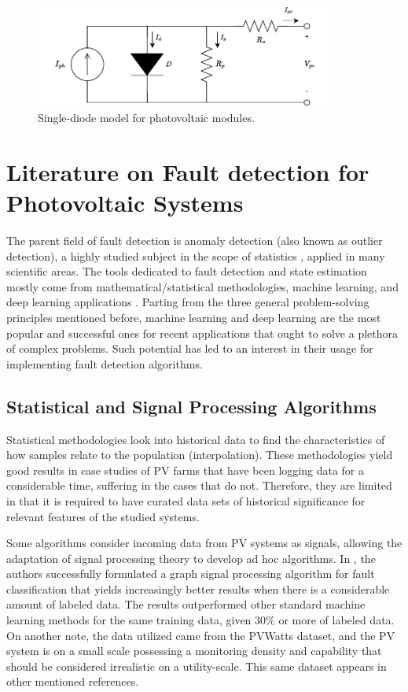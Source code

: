 \begin{figure}[h]
    \centering
    \includegraphics[width=10cm]{figures/chapter2/onediode.drawio.pdf} \caption{Single-diode model for photovoltaic modules.}
    \label{fig:onediodedraw}
\end{figure}

\section{Literature on Fault detection for Photovoltaic Systems}

The parent field of fault detection is anomaly detection (also known as outlier detection), a highly studied subject in the scope of statistics \cite{Prasad2009}, applied in many scientific areas. The tools dedicated to fault detection and state estimation mostly come from mathematical/statistical methodologies, machine learning, and deep learning applications \cite{AIPV}. Parting from the three general problem-solving principles mentioned before, machine learning and deep learning are the most popular and successful ones for recent applications that ought to solve a plethora of complex problems. Such potential has led to an interest in their usage for implementing fault detection algorithms.

\subsection{Statistical and Signal Processing Algorithms}

Statistical methodologies look into historical data to find the characteristics of how samples relate to the population (interpolation). These methodologies yield good results in case studies of PV farms that have been logging data for a considerable time, suffering in the cases that do not. Therefore, they are limited in that it is required to have curated data sets of historical significance for relevant features of the studied systems.


Some algorithms consider incoming data from PV systems as signals, allowing the adaptation of signal processing theory to develop ad hoc algorithms. In \cite{Fan2020}, the authors successfully formulated a graph signal processing algorithm for fault classification that yields increasingly better results when there is a considerable amount of labeled data. The results outperformed other standard machine learning methods for the same training data, given 30\% or more of labeled data. On another note, the data utilized came from the PVWatts \cite{Dobos2013} dataset, and the PV system is on a small scale possessing a monitoring density and capability that should be considered irrealistic on a utility-scale. This same dataset appears in other mentioned references.

